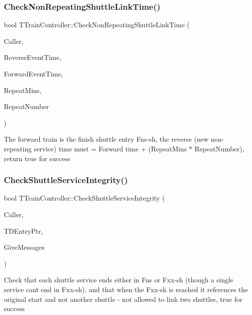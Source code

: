 \subsubsection{\texorpdfstring{Check\+Non\+Repeating\+Shuttle\+Link\+Time()}{CheckNonRepeatingShuttleLinkTime()}}
{\footnotesize\ttfamily bool T\+Train\+Controller\+::\+Check\+Non\+Repeating\+Shuttle\+Link\+Time (\begin{DoxyParamCaption}\item[{int}]{Caller,  }\item[{T\+Date\+Time}]{Reverse\+Event\+Time,  }\item[{T\+Date\+Time}]{Forward\+Event\+Time,  }\item[{int}]{Repeat\+Mins,  }\item[{int}]{Repeat\+Number }\end{DoxyParamCaption})}

The forward train is the finish shuttle entry \textquotesingle{}Fns-\/sh\textquotesingle{}, the reverse (new non-\/repeating service) time must = Forward time + (Repeat\+Mins $\ast$ Repeat\+Number), return true for success \mbox{\label{class_t_train_controller_a161fe7b4bbf101fc0a3f7eadd3aff9ca}} 
\subsubsection{\texorpdfstring{Check\+Shuttle\+Service\+Integrity()}{CheckShuttleServiceIntegrity()}}
{\footnotesize\ttfamily bool T\+Train\+Controller\+::\+Check\+Shuttle\+Service\+Integrity (\begin{DoxyParamCaption}\item[{int}]{Caller,  }\item[{\mbox{\hyperlink{class_t_train_data_entry}{T\+Train\+Data\+Entry}} $\ast$}]{T\+D\+Entry\+Ptr,  }\item[{bool}]{Give\+Messages }\end{DoxyParamCaption})}

Check that each shuttle service ends either in Fns or Fxx-\/sh (though a single service can\textquotesingle{}t end in Fxx-\/sh), and that when the Fxx-\/sh is reached it references the original start and not another shuttle -\/ not allowed to link two shuttles, true for success \mbox{\label{class_t_train_controller_ab8d8cf015d4784f12585f0ead325e9bf}} 
